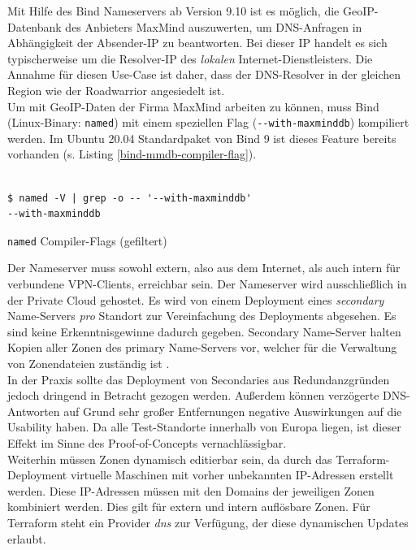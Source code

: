 Mit Hilfe des Bind Nameservers ab Version 9.10 ist es möglich, die GeoIP-Datenbank des Anbieters MaxMind auszuwerten, um DNS-Anfragen in Abhängigkeit der Absender-IP zu beantworten\cite{bindgeoip2020}. Bei dieser IP handelt es sich typischerweise um die Resolver-IP des \textit{lokalen} Internet-Dienstleisters. Die Annahme für diesen Use-Case ist daher, dass der DNS-Resolver in der gleichen Region wie der Roadwarrior angesiedelt ist\label{dns-resolver-region}.\\
Um mit GeoIP-Daten der Firma MaxMind arbeiten zu können, muss Bind (Linux-Binary: \texttt{named}) mit einem speziellen Flag (\texttt{-{}-with-maxminddb}) kompiliert werden. Im Ubuntu 20.04 Standardpaket von Bind 9 ist dieses Feature bereits vorhanden (s. Listing \ref{bind-mmdb-compiler-flag}).

\begin{listing}[h]
\begin{verbatim}

$ named -V | grep -o -- '--with-maxminddb'
--with-maxminddb

\end{verbatim}
\caption{\texttt{named} Compiler-Flags (gefiltert)}
\label{bind-mmdb-compiler-flag}
\end{listing}
Der Nameserver muss sowohl extern, also aus dem Internet, als auch intern für verbundene VPN-Clients, erreichbar sein. Der Nameserver wird ausschließlich in der Private Cloud gehostet. Es wird von einem \gls{Deployment} eines \textit{secondary} Name-Servers \textit{pro} Standort zur Vereinfachung des \gls{Deployment}s abgesehen. Es sind keine Erkenntnisgewinne dadurch gegeben. Secondary Name-Server halten Kopien aller Zonen des primary Name-Servers vor, welcher für die Verwaltung von Zonendateien zuständig ist \cite[S.517]{Fall2011}.\\
In der Praxis sollte das \gls{Deployment} von \glqq Secondaries\grqq{} aus Redundanzgründen jedoch dringend in Betracht gezogen werden. Außerdem können \glqq verzögerte\grqq{} DNS-Antworten auf Grund sehr großer Entfernungen negative Auswirkungen auf die Usability haben. Da alle Test-Standorte innerhalb von Europa liegen, ist dieser Effekt im Sinne des Proof-of-Concepts vernachlässigbar.\\
Weiterhin müssen Zonen dynamisch editierbar sein, da durch das Terraform-\gls{Deployment} virtuelle Maschinen mit vorher unbekannten IP-Adressen erstellt werden. Diese IP-Adressen müssen mit den Domains der jeweiligen Zonen kombiniert werden. Dies gilt für extern und intern auflösbare Zonen. Für Terraform steht ein Provider \textit{dns} zur Verfügung, der diese dynamischen Updates erlaubt\cite{dnstf2021}.
